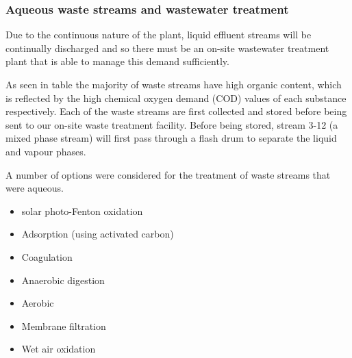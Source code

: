 \subsubsection{Aqueous waste streams and wastewater treatment}

Due to the continuous nature of the plant, liquid effluent streams will be continually discharged and so there must be an on-site wastewater treatment plant that is able to manage this demand sufficiently.  %

As seen in table %
the majority of waste streams have high organic content, which is reflected by the high chemical oxygen demand (COD) values of each substance respectively. Each of the waste streams are first collected and stored before being sent to our on-site waste treatment facility. Before being stored, stream 3-12 (a mixed phase stream) will first pass through a flash drum to separate the liquid and vapour phases. 

A number of options were considered for the treatment of waste streams that were aqueous. 


\begin{itemize}
    \item solar photo-Fenton oxidation
    
    
    \item Adsorption (using activated carbon)
    
    
    
    
    
    \item Coagulation
    
    
    
    
    
    \item Anaerobic digestion
    
    
    
    
    
    
    \item Aerobic
    
    
    
    
    \item Membrane filtration
    
    
    \item Wet air oxidation 
    
    
    
    
    
    
\end{itemize}

